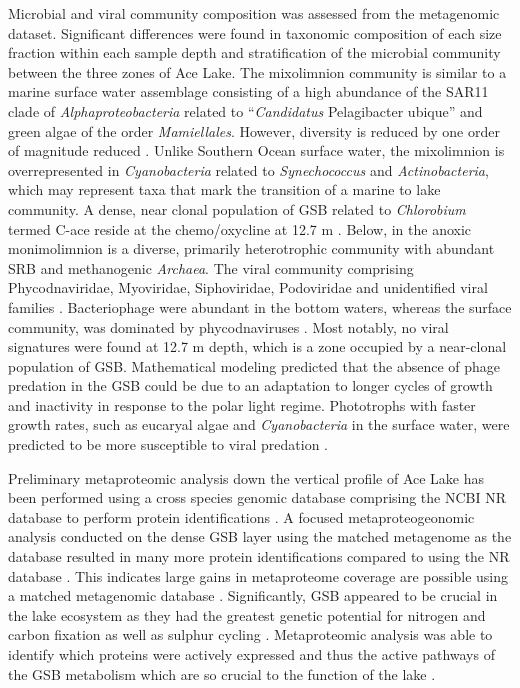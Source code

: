 Microbial and viral community composition was assessed from the metagenomic dataset.
Significant differences were found in taxonomic composition of each size fraction within each sample depth and stratification of the microbial community between the three zones of Ace Lake.
The mixolimnion community is similar to a marine surface water assemblage consisting of a high abundance of the SAR11 clade of \emph{Alphaproteobacteria} related to ``\emph{Candidatus} Pelagibacter ubique'' and green algae of the order \emph{Mamiellales}.
However, diversity is reduced by one order of magnitude reduced \cite{Lauro2011}.
Unlike Southern Ocean surface water, the mixolimnion is overrepresented in \emph{Cyanobacteria} related to \emph{Synechococcus} and \emph{Actinobacteria}, which may represent taxa that mark the transition of a marine to lake community.
A dense, near clonal population of \acl{GSB} related to \emph{Chlorobium} termed C-ace reside at the chemo/oxycline at 12.7 m \cite{Ng2010a, Lauro2011}.
Below, in the anoxic monimolimnion is a diverse, primarily heterotrophic community with abundant \ac{SRB} and methanogenic \emph{Archaea}.
The viral community comprising Phycodnaviridae, Myoviridae, Siphoviridae, Podoviridae and unidentified viral families \cite{Lauro2011}. 
Bacteriophage were abundant in the bottom waters, whereas the surface community, was dominated by phycodnaviruses \cite{Lauro2011}. 
Most notably, no viral signatures were found at 12.7 m depth, which is a zone occupied by a near-clonal population of \ac{GSB}. 
Mathematical modeling predicted that the absence of phage predation in the GSB could be due to an adaptation to longer cycles of growth and inactivity in response to the polar light regime. Phototrophs with faster growth rates, such as eucaryal algae and \emph{Cyanobacteria} in the surface water, were predicted to be more susceptible to viral predation \cite{Lauro2011}. 

Preliminary metaproteomic analysis down the vertical profile of Ace Lake has been performed using a cross species genomic database comprising the \ac{NCBI} \ac{NR} database to perform protein identifications \cite{Ng2010b}.
A focused metaproteogeonomic analysis conducted on the dense \ac{GSB} layer using the matched metagenome as the database resulted in many more protein identifications compared to using the \ac{NR} database \cite{Ng2010b}.
This indicates large gains in metaproteome coverage are possible using a matched metagenomic database \cite{Ng2010b}.
Significantly, \ac{GSB} appeared to be crucial in the lake ecosystem as they had the greatest genetic potential for nitrogen and carbon fixation as well as sulphur cycling \cite{Ng2010b, Lauro2011}.
Metaproteomic analysis was able to identify which proteins were actively expressed and thus the active pathways of the \ac{GSB} metabolism which are so crucial to the function of the lake \cite{Ng2010a}.

